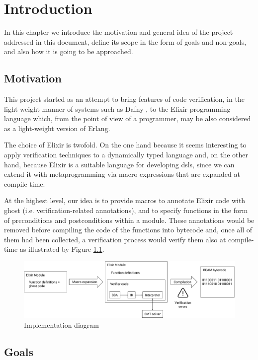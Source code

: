 \chapter{Introduction}
\label{cap:introduction}

In this chapter we introduce the motivation and general idea of the project
addressed in this document, define its scope in the form of goals and non-goals,
and also how it is going to be approached.

\section{Motivation}

This project started as an attempt to bring features of code verification, in
the light-weight manner of systems such as Dafny \citep{DafnyManual}, to the
Elixir programming language which, from the point of view of a programmer, may
be also considered as a light-weight version of Erlang.

The choice of Elixir is twofold. On the one hand because it seems interesting to
apply verification techniques to a dynamically typed language and, on the other
hand, because Elixir is a suitable language for developing \gls{dsl}s, since we
can extend it with metaprogramming via macro expressions that are expanded at
compile time.

At the highest level, our idea is to provide macros to annotate Elixir code with
ghost (i.e. verification-related annotations), and to specify functions in the
form of preconditions and postconditions within a module. These annotations
would be removed before compiling the code of the functions into bytecode and,
once all of them had been collected, a verification process would verify them
also at compile-time as illustrated by Figure \ref{fig:diag}.

\begin{figure}[h]
\includegraphics[width=\textwidth]{Images/Vectorial/Diagram}
\caption{Implementation diagram}
\label{fig:diag}
\end{figure}

\section{Goals}

